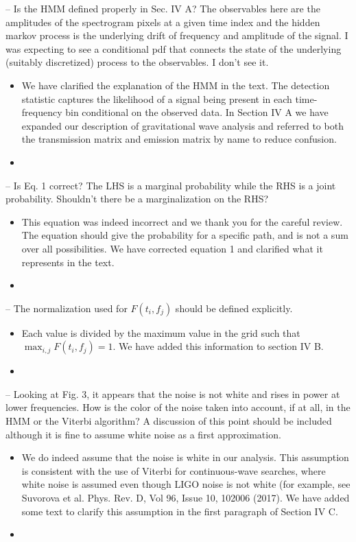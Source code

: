 \documentclass{article}
\newcommand{\han}{\textcolor{orange}}
\begin{document}
\noindent
-- Is the HMM defined properly in Sec. IV A? The observables here are the amplitudes of the spectrogram pixels at a given time index and the hidden markov process is the underlying drift of frequency and amplitude of the signal. I was expecting to see a conditional pdf that connects the state of the underlying (suitably discretized) process to the observables. I don't see it.
\begin{itemize}
\item We have clarified the explanation of the HMM in the text. The detection statistic captures the likelihood of a signal being present in each time-frequency bin conditional on the observed data. In Section IV A we have expanded our description of gravitational wave analysis and referred to both the transmission matrix and emission matrix by name to reduce confusion.%
\item[]
\end{itemize}

\noindent
-- Is Eq. 1 correct? The LHS is a marginal probability while the RHS is a joint probability. Shouldn't there be a marginalization on the RHS?
\begin{itemize}
\item This equation was indeed incorrect and we thank you for the careful review. The equation should give the probability for a specific path, and is not a sum over all possibilities. We have corrected equation 1 and clarified what it represents in the text.
\item[]
\end{itemize}

\noindent
-- The normalization used for $F(t_i, f_j)$ should be defined explicitly. 
\begin{itemize}
\item Each value is divided by the maximum value in the grid such that $\max_{i,j} F(t_i, f_j) = 1$. We have added this information to section IV B.
\item[]
\end{itemize}

\noindent
-- Looking at Fig. 3, it appears that the noise is not white and rises in power at lower frequencies. How is the color of the noise taken into account, if at all, in the HMM or the Viterbi algorithm? A discussion of this point should be included although it is fine to assume white noise as a first approximation. 
\begin{itemize}
\item We do indeed assume that the noise is white in our analysis. This assumption is consistent with the use of Viterbi for continuous-wave searches, where white noise is assumed even though LIGO noise is not white (for example, see Suvorova et al. Phys. Rev. D, Vol 96, Issue 10, 102006 (2017). We have added some text to clarify this assumption in the first paragraph of Section IV C.
\item[]
\end{itemize}
\end{document}
